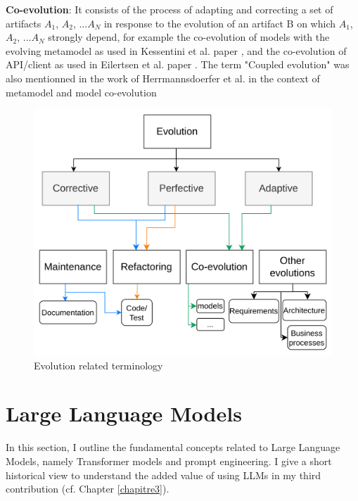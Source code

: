 \textbf{Co-evolution}: It consists of the process of adapting and correcting a set of artifacts $A_1$, $A_2$, ...$A_N$ in response to the evolution of an artifact B on which $A_1$, $A_2$, ...$A_N$  strongly depend, for example the co-evolution of models with the evolving metamodel as used in Kessentini et al. paper \cite{Kessentini2016automated}, and the co-evolution of API/client as used in Eilertsen et al. paper \cite{8443581}. The term "Coupled evolution" was also mentionned in the work of Herrmannsdoerfer et al. in the context of metamodel and model co-evolution \cite{herrmannsdoerfer2009cope}




\begin{figure}[t]
	\begin{center}
		\includegraphics[width=0.6\linewidth]{./pics/soaPics/evolutiontypes.png}
	\end{center}
	\caption{Evolution related terminology}
	\label{fig:evolutiontypes}
\end{figure}

\section{Large Language Models}
\label{llm}
In this section, I outline the fundamental concepts related to Large Language Models, namely Transformer models and prompt engineering. I give a short historical view to understand the added value of using LLMs in my third contribution (cf. Chapter \ref{chapitre3}).

